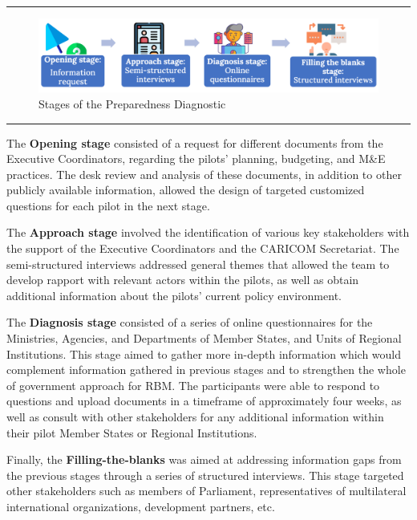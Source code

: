 \documentclass[
  10pt,
]{book}
\begin{document}
\begin{center}\rule{0.5\linewidth}{0.5pt}\end{center}

\begin{figure}

{\centering \includegraphics[width=1\linewidth]{./images/figure_4} 

}

\caption{Stages of the Preparedness Diagnostic}\label{fig:figure4}
\end{figure}

\begin{center}\rule{0.5\linewidth}{0.5pt}\end{center}

The \textbf{Opening stage} consisted of a request for different documents from the Executive Coordinators, regarding the pilots' planning, budgeting, and M\&E practices. The desk review and analysis of these documents, in addition to other publicly available information, allowed the design of targeted customized questions for each pilot in the next stage.

The \textbf{Approach stage} involved the identification of various key stakeholders with the support of the Executive Coordinators and the CARICOM Secretariat. The semi-structured interviews addressed general themes that allowed the team to develop rapport with relevant actors within the pilots, as well as obtain additional information about the pilots' current policy environment.

The \textbf{Diagnosis stage} consisted of a series of online questionnaires for the Ministries, Agencies, and Departments of Member States, and Units of Regional Institutions. This stage aimed to gather more in-depth information which would complement information gathered in previous stages and to strengthen the whole of government approach for RBM. The participants were able to respond to questions and upload documents in a timeframe of approximately four weeks, as well as consult with other stakeholders for any additional information within their pilot Member States or Regional Institutions.

Finally, the \textbf{Filling-the-blanks} was aimed at addressing information gaps from the previous stages through a series of structured interviews. This stage targeted other stakeholders such as members of Parliament, representatives of multilateral international organizations, development partners, etc.
\end{document}
